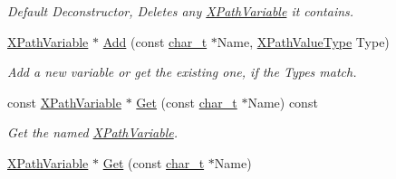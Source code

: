 \begin{DoxyCompactItemize}
\begin{DoxyCompactList}\small\item\em Default Deconstructor, Deletes any \hyperlink{classMezzanine_1_1xml_1_1XPathVariable}{XPathVariable} it contains. \item\end{DoxyCompactList}\item 
\hyperlink{classMezzanine_1_1xml_1_1XPathVariable}{XPathVariable} $\ast$ \hyperlink{classMezzanine_1_1xml_1_1XPathVariableSet_a4663935811c86f0f84f8e8570f77c266}{Add} (const \hyperlink{namespaceMezzanine_1_1xml_a29b8a47c179e9895c4e9e66c45d1dbbc}{char\_\-t} $\ast$Name, \hyperlink{namespaceMezzanine_1_1xml_aca3f7ad3597c316e5ee6c216e126e7b0}{XPathValueType} Type)
\begin{DoxyCompactList}\small\item\em Add a new variable or get the existing one, if the Types match. \item\end{DoxyCompactList}\item 
const \hyperlink{classMezzanine_1_1xml_1_1XPathVariable}{XPathVariable} $\ast$ \hyperlink{classMezzanine_1_1xml_1_1XPathVariableSet_a59cc170a90ba08978c1a04163bb6ea79}{Get} (const \hyperlink{namespaceMezzanine_1_1xml_a29b8a47c179e9895c4e9e66c45d1dbbc}{char\_\-t} $\ast$Name) const 
\begin{DoxyCompactList}\small\item\em Get the named \hyperlink{classMezzanine_1_1xml_1_1XPathVariable}{XPathVariable}. \item\end{DoxyCompactList}\item 
\hypertarget{classMezzanine_1_1xml_1_1XPathVariableSet_a059098de29f8320bc9cd8101b354dc01}{
\hyperlink{classMezzanine_1_1xml_1_1XPathVariable}{XPathVariable} $\ast$ \hyperlink{classMezzanine_1_1xml_1_1XPathVariableSet_a059098de29f8320bc9cd8101b354dc01}{Get} (const \hyperlink{namespaceMezzanine_1_1xml_a29b8a47c179e9895c4e9e66c45d1dbbc}{char\_\-t} $\ast$Name)}
\label{classMezzanine_1_1xml_1_1XPathVariableSet_a059098de29f8320bc9cd8101b354dc01}


\end{DoxyCompactItemize}
